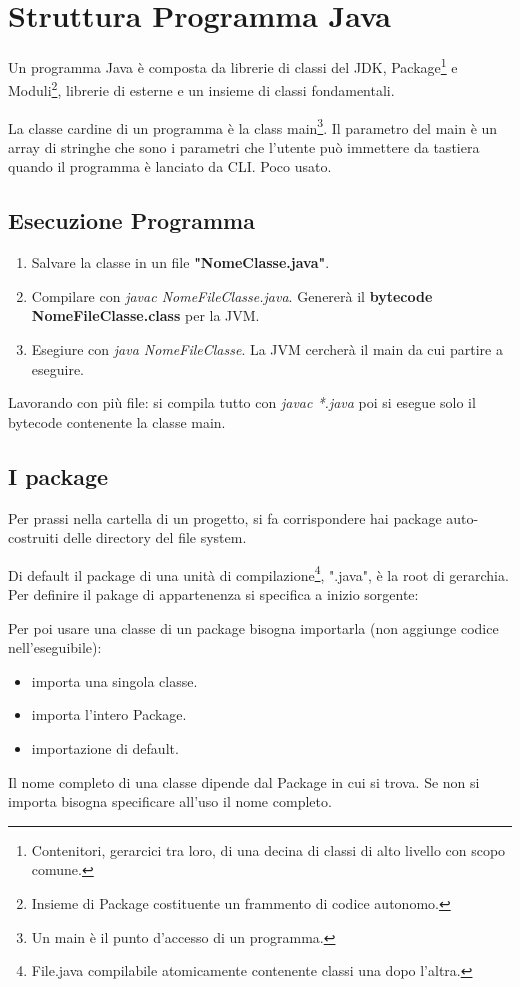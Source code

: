 \section{Struttura Programma Java}
Un programma Java è composta da librerie di classi del JDK, Package\footnote{Contenitori, gerarcici tra loro, di una decina di classi di alto livello con scopo comune.} e Moduli\footnote{Insieme di Package costituente un frammento di codice autonomo.}, librerie di esterne e un insieme di classi fondamentali.

La classe cardine di un programma è la class main\footnote{Un main è il punto d'accesso di un programma.}.
Il parametro del main è un array di stringhe che sono i parametri che l'utente può immettere da tastiera quando il programma è lanciato da CLI. Poco usato.

\subsection{Esecuzione Programma}
\begin{enumerate}
	\item Salvare la classe in un file \textbf{"NomeClasse.java"}.
	\item Compilare con \textit{javac NomeFileClasse.java}. Genererà il \textbf{bytecode NomeFileClasse.class} per la JVM.
	\item Esegiure con \textit{java NomeFileClasse}. La JVM cercherà il main da cui partire a eseguire.
\end{enumerate}
Lavorando con più file: si compila tutto con \textit{javac *.java} poi si esegue solo il bytecode contenente la classe main.

\subsection{I package}
Per prassi nella cartella di un progetto, si fa corrispondere hai package auto-costruiti delle directory del file system.

Di default il package di una unità di compilazione\footnote{File.java compilabile atomicamente contenente classi una dopo l'altra.}, ".java", è la root di gerarchia.
Per definire il pakage di appartenenza si specifica a inizio sorgente:


Per poi usare una classe di un package bisogna importarla (non aggiunge codice nell'eseguibile):
\begin{itemize}
	\item {} importa una singola classe.
	\item {} importa l'intero Package.
	\item {} importazione di default.
\end{itemize}
Il nome completo di una classe dipende dal Package in cui si trova. Se non si importa bisogna specificare all'uso il nome completo.

